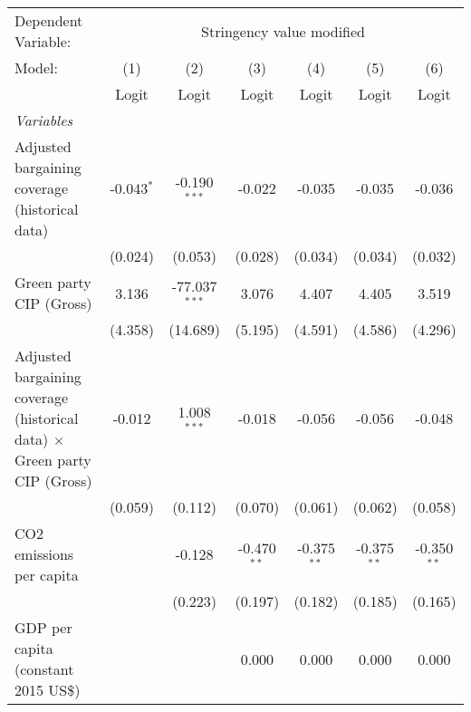
\begingroup
\centering
\begin{tabular}{lcccccc}
   \toprule
   Dependent Variable: & \multicolumn{6}{c}{Stringency value modified}\\
   Model:                                                                           & (1)          & (2)             & (3)           & (4)           & (5)           & (6)\\  
                                                                                    &  Logit       & Logit           & Logit         & Logit         & Logit         & Logit\\  
   \midrule
   \emph{Variables}\\
   Adjusted bargaining coverage (historical data)                                   & -0.043$^{*}$ & -0.190$^{***}$  & -0.022        & -0.035        & -0.035        & -0.036\\   
                                                                                    & (0.024)      & (0.053)         & (0.028)       & (0.034)       & (0.034)       & (0.032)\\   
   Green party CIP (Gross)                                                          & 3.136        & -77.037$^{***}$ & 3.076         & 4.407         & 4.405         & 3.519\\   
                                                                                    & (4.358)      & (14.689)        & (5.195)       & (4.591)       & (4.586)       & (4.296)\\   
   Adjusted bargaining coverage (historical data) $\times$ Green party CIP (Gross)  & -0.012       & 1.008$^{***}$   & -0.018        & -0.056        & -0.056        & -0.048\\   
                                                                                    & (0.059)      & (0.112)         & (0.070)       & (0.061)       & (0.062)       & (0.058)\\   
   CO2 emissions per capita                                                         &              & -0.128          & -0.470$^{**}$ & -0.375$^{**}$ & -0.375$^{**}$ & -0.350$^{**}$\\   
                                                                                    &              & (0.223)         & (0.197)       & (0.182)       & (0.185)       & (0.165)\\   
   GDP per capita (constant 2015 US\$)                                              &              &                 & 0.000         & 0.000         & 0.000         & 0.000\\   

\end{tabular}
